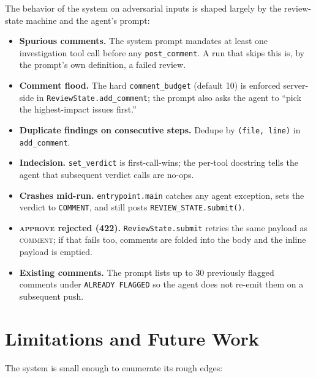 \documentclass[11pt,a4paper]{article}
\newcommand{\code}[1]{\texttt{\small #1}}
\begin{document}
The behavior of the system on adversarial inputs is shaped largely by the
review-state machine and the agent's prompt:

\begin{itemize}[leftmargin=*]
  \item \textbf{Spurious comments.} The system prompt mandates at least one
        investigation tool call before any \code{post\_comment}. A run that
        skips this is, by the prompt's own definition, a failed review.
  \item \textbf{Comment flood.} The hard \code{comment\_budget} (default
        10) is enforced server-side in \code{ReviewState.add\_comment};
        the prompt also asks the agent to ``pick the highest-impact issues
        first.''
  \item \textbf{Duplicate findings on consecutive steps.} Dedupe by
        \code{(file, line)} in \code{add\_comment}.
  \item \textbf{Indecision.} \code{set\_verdict} is first-call-wins; the
        per-tool docstring tells the agent that subsequent verdict calls
        are no-ops.
  \item \textbf{Crashes mid-run.} \code{entrypoint.main} catches any agent
        exception, sets the verdict to \code{COMMENT}, and still posts
        \code{REVIEW\_STATE.submit()}.
  \item \textbf{\textsc{approve} rejected (422).} \code{ReviewState.submit}
        retries the same payload as \textsc{comment}; if that fails too,
        comments are folded into the body and the inline payload is
        emptied.
  \item \textbf{Existing comments.} The prompt lists up to 30 previously
        flagged comments under \code{ALREADY FLAGGED} so the agent does
        not re-emit them on a subsequent push.
\end{itemize}

\section{Limitations and Future Work}

The system is small enough to enumerate its rough edges:
\end{document}
